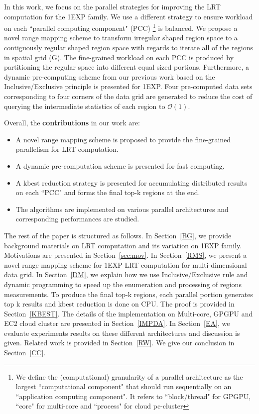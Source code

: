 \documentclass[AMA,LATO1COL]{WileyNJD-v2}
\newcommand\bigo{\mathcal O}
\begin{document}
\noindent In this work, we focus on the parallel strategies for improving the LRT computation for the 1EXP family. We use a different strategy to ensure workload on each ``parallel computing component" (PCC) \footnote{We define the (computational) granularity of a parallel architecture as the largest ``computational component" that should run sequentially on an ``application computing component". It refers to ``block/thread" for GPGPU, ``core" for multi-core and ``process" for cloud pc-cluster} is balanced. We propose a novel range mapping scheme to transform irregular shaped region space to a contiguously regular shaped region space with regards to iterate all of the regions in spatial grid (G). The fine-grained workload on each PCC is produced by partitioning the regular space into different equal sized portions. Furthermore, a dynamic pre-computing scheme from our previous work\cite{apweb} based on the Inclusive/Exclusive principle is presented for 1EXP. Four pre-computed data sets corresponding to four corners of the data grid are generated to reduce the cost of querying the intermediate statistics of each region to $\bigo(1)$.

Overall, the {\bf contributions} in our work are:
\begin{itemize}
\renewcommand{\labelitemi}{$\bullet$}
\item A novel range mapping scheme is proposed to provide the fine-grained parallelism for LRT computation.
\item A dynamic pre-computation scheme is presented for fast computing.
\item A kbest reduction strategy is presented for accumulating distributed results on each ``PCC" and forms the final top-k regions at the end.
\item The algorithms are implemented on various parallel architectures and corresponding performances are studied.
\end{itemize}

The rest of the paper is structured as follows. In Section~\ref{BG}, we provide
background materials on LRT computation and its variation on 1EXP family. Motivations are presented in Section~\ref{sec:mov}.  In Section~\ref{RMS}, we present a novel range mapping scheme for 1EXP LRT computation for multi-dimensional data grid. In Section~\ref{DM}, we explain how we use
Inclusive/Exclusive rule and dynamic programming to speed up the enumeration and
processing of regions measurements. To produce the final top-k regions, each parallel portion generates top k results and kbest reduction is done on CPU. The proof is provided in Section~\ref{KBEST}. The details of the implementation on Multi-core, GPGPU and EC2 cloud cluster are presented in
Section~\ref{IMPDA}. In Section~\ref{EA}, we evaluate experiments results on these different architectures and discussion is given. Related
work is provided in Section~\ref{RW}. We give our conclusion in
Section~\ref{CC}.
\end{document}

